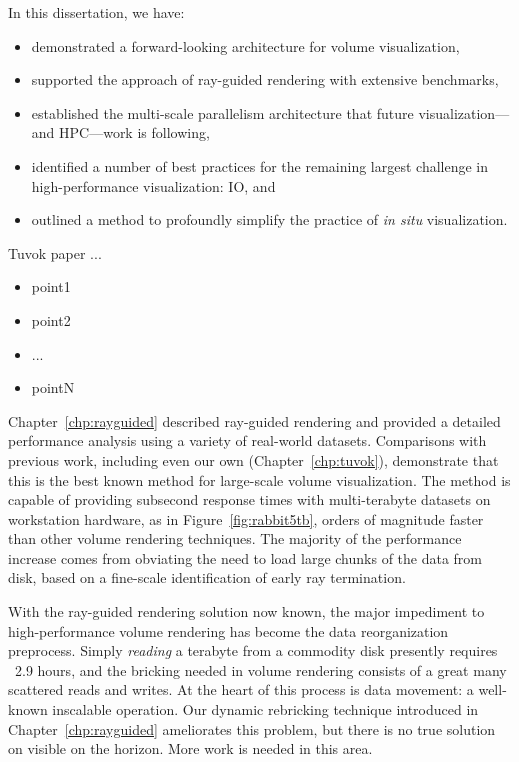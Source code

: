 In this dissertation, we have:
\begin{itemize}
	\item demonstrated a forward-looking architecture for volume visualization,
	\item supported the approach of ray-guided rendering with extensive
benchmarks,
	\item established the multi-scale parallelism architecture that future
	visualization---and HPC---work is following,
	\item identified a number of best practices for the remaining largest
challenge in high-performance visualization: IO, and
	\item outlined a method to profoundly simplify the practice of \textit{in
situ} visualization.
\end{itemize}

Tuvok paper ...
\begin{itemize}
	\item point1
	\item point2
	\item ...
	\item pointN
\end{itemize}

Chapter~\ref{chp:rayguided} described ray-guided rendering and provided
a detailed performance analysis using a variety of real-world datasets.
Comparisons with previous work, including even our own
(Chapter~\ref{chp:tuvok}), demonstrate that this is the best known
method for large-scale volume visualization.  The method is capable of
providing subsecond response times with multi-terabyte datasets on
workstation hardware, as in Figure~\ref{fig:rabbit5tb}, orders of
magnitude faster than other volume rendering techniques.  The majority
of the performance increase comes from obviating the need to load large
chunks of the data from disk, based on a fine-scale identification of
early ray termination.


With the ray-guided rendering solution now known, the major impediment
to high-performance volume rendering has become the data reorganization
preprocess.  Simply \emph{reading} a terabyte from a commodity disk
presently requires ~2.9 hours, and the bricking needed in volume
rendering consists of a great many scattered reads and writes.  At
the heart of this process is data movement: a well-known inscalable
operation.  Our dynamic rebricking technique introduced in
Chapter~\ref{chp:rayguided} ameliorates this problem, but there is no
true solution on visible on the horizon.  More work is needed in this
area.

